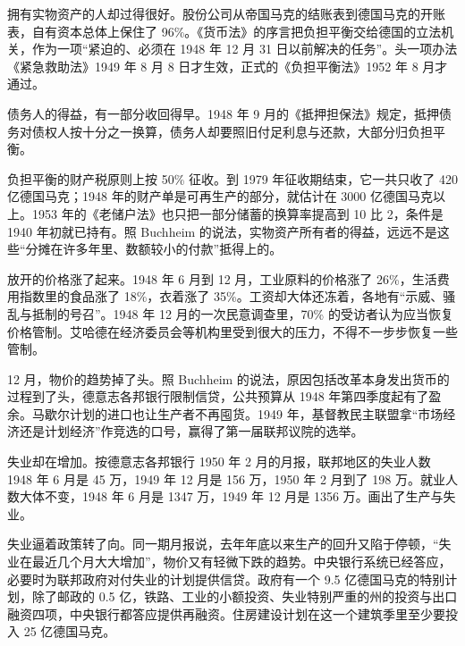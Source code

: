 拥有实物资产的人却过得很好\cite{buchheim1988}。股份公司从帝国马克的结账表到德国马克的开账表，自有资本总体上保住了 96\%\cite{buchheim1988}。《货币法》的序言把负担平衡交给德国的立法机关，作为一项“紧迫的、必须在 1948 年 12 月 31 日以前解决的任务”\cite{waehrungsgesetz1948}。头一项办法《紧急救助法》1949 年 8 月 8 日才生效，正式的《负担平衡法》1952 年 8 月才通过\cite{buchheim1988}。

债务人的得益，有一部分收回得早。1948 年 9 月的《抵押担保法》规定，抵押债务对债权人按十分之一换算，债务人却要照旧付足利息与还款，大部分归负担平衡\cite{buchheim1988}。

负担平衡的财产税原则上按 50\% 征收\cite{buchheim1988}。到 1979 年征收期结束，它一共只收了 420 亿德国马克；1948 年的财产单是可再生产的部分，就估计在 3000 亿德国马克以上\cite{buchheim1988}。1953 年的《老储户法》也只把一部分储蓄的换算率提高到 10 比 2，条件是 1940 年初就已持有\cite{buchheim1988}。照 Buchheim 的说法，实物资产所有者的得益，远远不是这些“分摊在许多年里、数额较小的付款”抵得上的\cite{buchheim1988}。

放开的价格涨了起来。1948 年 6 月到 12 月，工业原料的价格涨了 26\%，生活费用指数里的食品涨了 18\%，衣着涨了 35\%\cite{buchheim1988}。工资却大体还冻着，各地有“示威、骚乱与抵制的号召”\cite{buchheim1988}。1948 年 12 月的一次民意调查里，70\% 的受访者认为应当恢复价格管制\cite{buchheim1988}。艾哈德在经济委员会等机构里受到很大的压力，不得不一步步恢复一些管制\cite{buchheim1988}。

12 月，物价的趋势掉了头\cite{buchheim1988}。照 Buchheim 的说法，原因包括改革本身发出货币的过程到了头，德意志各邦银行限制信贷，公共预算从 1948 年第四季度起有了盈余\cite{buchheim1988}。马歇尔计划的进口也让生产者不再囤货\cite{buchheim1988}。1949 年，基督教民主联盟拿“市场经济还是计划经济”作竞选的口号，赢得了第一届联邦议院的选举\cite{buchheim1988}。

失业却在增加。按德意志各邦银行 1950 年 2 月的月报，联邦地区的失业人数 1948 年 6 月是 45 万，1949 年 12 月是 156 万，1950 年 2 月到了 198 万\cite{bdl1950}。就业人数大体不变，1948 年 6 月是 1347 万，1949 年 12 月是 1356 万\cite{bdl1950}。画出了生产与失业。

失业逼着政策转了向。同一期月报说，去年年底以来生产的回升又陷于停顿，“失业在最近几个月大大增加”，物价又有轻微下跌的趋势\cite{bdl1950}。中央银行系统已经答应，必要时为联邦政府对付失业的计划提供信贷\cite{bdl1950}。政府有一个 9.5 亿德国马克的特别计划，除了邮政的 0.5 亿，铁路、工业的小额投资、失业特别严重的州的投资与出口融资四项，中央银行都答应提供再融资\cite{bdl1950}。住房建设计划在这一个建筑季里至少要投入 25 亿德国马克\cite{bdl1950}。


